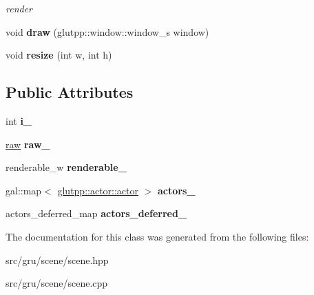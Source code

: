 \begin{DoxyCompactItemize}
\begin{DoxyCompactList}\small\item\em render \end{DoxyCompactList}\item 
\hypertarget{classglutpp_1_1scene_1_1scene_a9bbb023db7322d1aed04f9ae5c541222}{void {\bfseries draw} (glutpp\-::window\-::window\-\_\-s window)}\label{classglutpp_1_1scene_1_1scene_a9bbb023db7322d1aed04f9ae5c541222}

\item 
\hypertarget{classglutpp_1_1scene_1_1scene_aff3b39ef52ea118f99a2e02e3ff819d9}{void {\bfseries resize} (int w, int h)}\label{classglutpp_1_1scene_1_1scene_aff3b39ef52ea118f99a2e02e3ff819d9}

\end{DoxyCompactItemize}
\subsection*{\-Public \-Attributes}
\begin{DoxyCompactItemize}
\item 
\hypertarget{classglutpp_1_1scene_1_1scene_a928bc6e75e5521c28ccdd48f6b54da80}{int {\bfseries i\-\_\-}}\label{classglutpp_1_1scene_1_1scene_a928bc6e75e5521c28ccdd48f6b54da80}

\item 
\hypertarget{classglutpp_1_1scene_1_1scene_af6e1bc3b0f6139a204bda6f1084cf14e}{\hyperlink{classglutpp_1_1scene_1_1raw}{raw} {\bfseries raw\-\_\-}}\label{classglutpp_1_1scene_1_1scene_af6e1bc3b0f6139a204bda6f1084cf14e}

\item 
\hypertarget{classglutpp_1_1scene_1_1scene_ae7cb4b325dcdf8a43307927db29d8dcc}{renderable\-\_\-w {\bfseries renderable\-\_\-}}\label{classglutpp_1_1scene_1_1scene_ae7cb4b325dcdf8a43307927db29d8dcc}

\item 
\hypertarget{classglutpp_1_1scene_1_1scene_af54deb6f8bbc4044640249810d90579c}{gal\-::map$<$ \hyperlink{classglutpp_1_1actor_1_1actor}{glutpp\-::actor\-::actor} $>$ {\bfseries actors\-\_\-}}\label{classglutpp_1_1scene_1_1scene_af54deb6f8bbc4044640249810d90579c}

\item 
\hypertarget{classglutpp_1_1scene_1_1scene_a311bc04b84484ff34e30a52350f011d8}{actors\-\_\-deferred\-\_\-map {\bfseries actors\-\_\-deferred\-\_\-}}\label{classglutpp_1_1scene_1_1scene_a311bc04b84484ff34e30a52350f011d8}

\end{DoxyCompactItemize}


\-The documentation for this class was generated from the following files\-:\begin{DoxyCompactItemize}
\item 
src/gru/scene/scene.\-hpp\item 
src/gru/scene/scene.\-cpp\end{DoxyCompactItemize}
